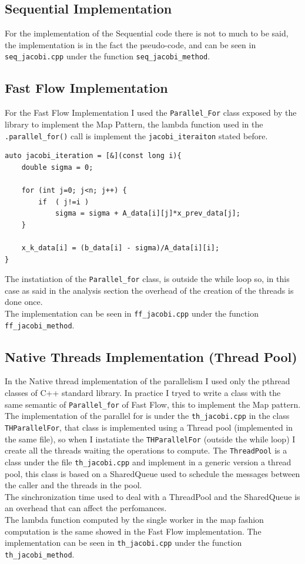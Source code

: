 \documentclass[12pt]{extarticle}
\begin{document}
\subsection{Sequential Implementation}
For the implementation of the Sequential code there is not to much to be said, the implementation is in the fact the pseudo-code, and can be seen in \texttt{seq\_jacobi.cpp} under the function \texttt{seq\_jacobi\_method}.

\subsection{Fast Flow Implementation}
For the Fast Flow Implementation I used the \texttt{Parallel\_For} class exposed by the library to implement the Map Pattern, the lambda function used in the \texttt{.parallel\_for()} call is implement the \texttt{jacobi\_iteraiton} stated before.\\
\begin{lstlisting}
auto jacobi_iteration = [&](const long i){
    double sigma = 0;

    for (int j=0; j<n; j++) {
        if  ( j!=i )
            sigma = sigma + A_data[i][j]*x_prev_data[j];
    }

    x_k_data[i] = (b_data[i] - sigma)/A_data[i][i];
}
\end{lstlisting}
The instatiation of the \texttt{Parallel\_for} class, is outside the while loop so, in this case as said in the analysis section the overhead of the creation of the threads is done once.\\
The implementation can be seen in \texttt{ff\_jacobi.cpp} under the function     \texttt{ff\_jacobi\_method}.

\subsection{Native Threads Implementation (Thread Pool)}
In the Native thread implementation of the parallelism I used only the pthread classes of C++ standard library. In practice I tryed to write a class with the same semantic of \texttt{Parallel\_for} of Fast Flow, this to implement the Map pattern.\\
The implementation of the parallel for is under the \texttt{th\_jacobi.cpp} in the class \texttt{THParallelFor}, that class is implemented using a Thread pool (implemented in the same file), so when I instatiate the \texttt{THParallelFor} (outside the while loop) I create all the threads waiting the operations to compute. The \texttt{ThreadPool} is a class under the file \texttt{th\_jacobi.cpp} and implement in a generic version a thread pool, this class is based on a SharedQueue used to schedule the messages between the caller and the threads in the pool.\\
The sinchronization time used to deal with a ThreadPool and the SharedQueue is an overhead that can affect the perfomances.\\
The lambda function computed by the single worker in the map fashion computation is the same showed in the Fast Flow implementation.
The implementation can be seen in \texttt{th\_jacobi.cpp} under the function \texttt{th\_jacobi\_method}.
\end{document}
